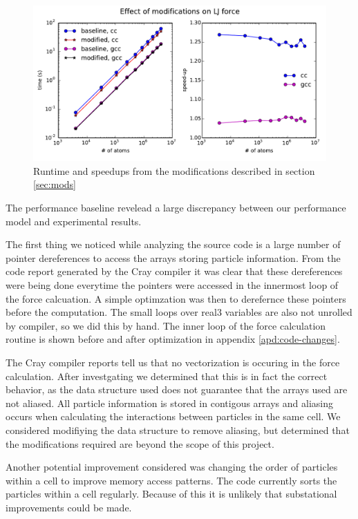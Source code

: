 \documentclass[12pt]{article}
\begin{document}
\begin{figure}[h!]
  \centering
  \includegraphics[width=\textwidth]{../figs/modified_forceLJ}
  \caption{Runtime and speedups from the modifications described in
    section \ref{sec:mods}}
  \label{fig:mod-force}
\end{figure}

The performance baseline revelead a large discrepancy between our
performance model and experimental results.

The first thing we noticed while analyzing the source code is a large
number of pointer dereferences to access the arrays storing particle
information. From the code report generated by the Cray compiler it
was clear that these dereferences were being done everytime the
pointers were accessed in the innermost loop of the force
calcuation. A simple optimzation was then to derefernce these pointers
before the computation. The small loops over real3 variables are also
not unrolled by compiler, so we did this by hand. The inner loop of
the force calculation routine is shown before and after optimization
in appendix \ref{apd:code-changes}.

The Cray compiler reports tell us that no vectorization is occuring in
the force calculation. After investgating we determined that this is
in fact the correct behavior, as the data structure used does not
guarantee that the arrays used are not aliased. All particle
information is stored in contigous arrays and aliasing occurs when
calculating the interactions between particles in the same cell. We
considered modifiying the data structure to remove aliasing, but
determined that the modifications required are beyond the scope of
this project.

Another potential improvement considered was changing the order of
particles within a cell to improve memory access patterns. The code
currently sorts the particles within a cell regularly. Because of this
it is unlikely that substational improvements could be made.
\end{document}
